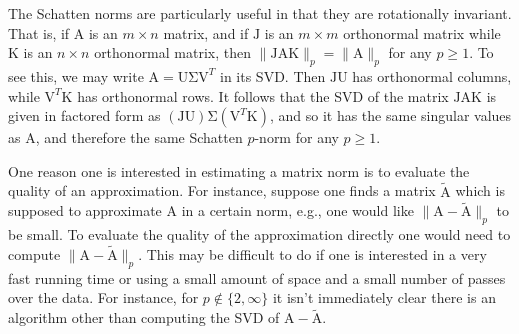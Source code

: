 \documentclass[11pt]{article}
\newcommand{\mat}[1]{{\ensuremath{\bm{\mathrm{#1}}}}}
\def\matA{\mat{A}}
\def\matJ{\mat{J}}
\def\matK{\mat{K}}
\def\matU{\mat{U}}
\def\matV{\mat{V}}
\begin{document}
The Schatten norms are particularly useful
in that they are rotationally invariant. That is, if $\matA$ is an $m \times n$ matrix, and if $\matJ$ is
an $m \times m$ orthonormal matrix while $\matK$ is an $n \times n$ orthonormal matrix, then 
$\|\matJ\matA\matK\|_p = \|\matA\|_p$ for any $p \geq 1$. To see this, we may write $\matA = \matU \mat\Sigma \matV^T$ in its
SVD. Then $\matJ\matU$ has orthonormal columns, while $\matV^T\matK$ has orthonormal rows. It follows that
the SVD of the matrix $\matJ\matA\matK$ is given in factored form as $(\matJ\matU) \mat\Sigma (\matV^T\matK)$, and so it has
the same singular values as $\matA$, and therefore the same Schatten $p$-norm for any $p \geq 1$. 

One reason one is interested in estimating a matrix norm is to evaluate the quality of an approximation.
For instance, suppose one finds a matrix $\tilde{\matA}$ which is supposed to approximate $\matA$ in a certain
norm, e.g., one would like $\|\matA-\tilde{\matA}\|_p$ to be small. To evaluate the quality of the approximation
directly one would need to compute $\|\matA-\tilde{\matA}\|_p$. This may be difficult to do if one is interested
in a very fast running time or using a small amount of space and a small number of passes over the data. 
For instance, for $p \notin \{2, \infty\}$
it isn't immediately clear there is an algorithm other than computing the SVD of $\matA-\tilde{\matA}$. 
\end{document}

